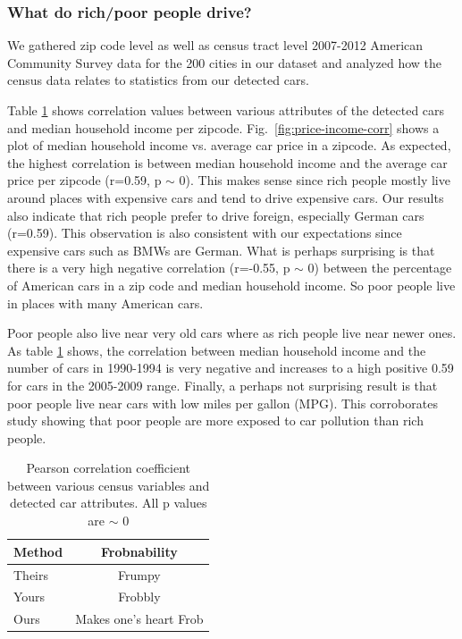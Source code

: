 \documentclass[10pt,twocolumn,letterpaper]{article}
\begin{document}
\subsubsection{What do rich/poor people drive?}
We gathered zip code level as well as census tract level 2007-2012 American Community Survey data for the 200 cities in our dataset and analyzed how the census data relates to statistics from our detected cars. 

Table \ref{table:car-census-corrs} shows correlation values between various attributes of the detected cars and median household income per zipcode. Fig.~\ref{fig:price-income-corr} shows a plot of median household income vs. average car price in a zipcode. As expected, the highest correlation is between median household income and the average car price per zipcode (r=0.59, p \(\sim\) 0). This makes sense since rich people mostly live around places with expensive cars and tend to drive expensive cars. Our results also indicate that rich people prefer to drive foreign, especially German cars (r=0.59). This observation is also consistent with our expectations since expensive cars such as BMWs are German. What is perhaps surprising is that there is a very high negative correlation (r=-0.55, p \(\sim\) 0) between the percentage of American cars in a zip code and median household income. So poor people live in places with many American cars.

Poor people also live near very old cars where as rich people live near newer ones. As table \ref{table:car-census-corrs} shows, the correlation between median household income and the number of cars in 1990-1994 is very negative and increases to a high positive 0.59 for cars in the 2005-2009 range. Finally, a perhaps not surprising result is that poor people live near cars with low miles per gallon (MPG). This corroborates~\cite{cal-traffic-study} study showing that poor people are more exposed to car pollution than rich people.
 

\begin{table}
\begin{center}
\begin{tabular}{|l|c|}
\hline
Method & Frobnability \\
\hline\hline
Theirs & Frumpy \\
Yours & Frobbly \\
Ours & Makes one's heart Frob\\
\hline
\end{tabular}
\end{center}
\caption{Pearson correlation coefficient between various census variables and detected car attributes. All p values are \(\sim\) 0}
\label{table:car-census-corrs}
\end{table}
\end{document}
